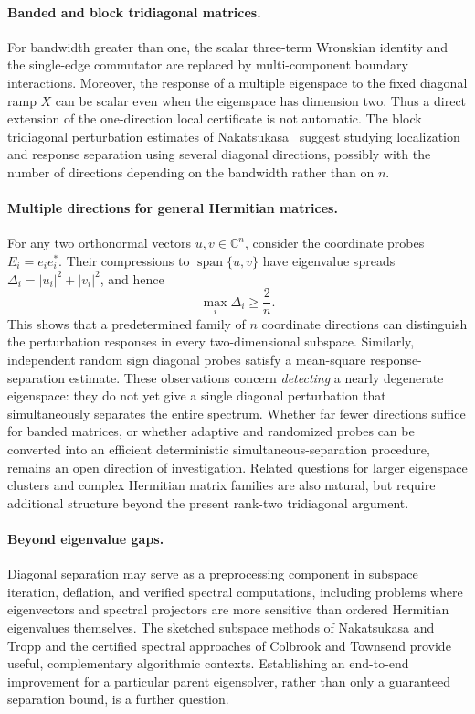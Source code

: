 \documentclass[10pt,a4paper]{article}
\begin{document}
\paragraph{Banded and block tridiagonal matrices.}
For bandwidth greater than one, the scalar three-term Wronskian
identity and the single-edge commutator are replaced by multi-component
boundary interactions. Moreover, the response of a multiple eigenspace
to the fixed diagonal ramp $X$ can be scalar even when the eigenspace
has dimension two. Thus a direct extension of the one-direction
local certificate is not automatic. The block tridiagonal perturbation
estimates of Nakatsukasa~\cite{Nakatsukasa2012} suggest studying
localization and response separation using several diagonal
directions, possibly with the number of directions depending on the
bandwidth rather than on $n$.

\paragraph{Multiple directions for general Hermitian matrices.}
For any two orthonormal vectors $u,v\in\mathbb C^n$, consider the
coordinate probes $E_i=e_ie_i^*$. Their compressions to
$\operatorname{span}\{u,v\}$ have eigenvalue spreads
$\Delta_i=|u_i|^2+|v_i|^2$, and hence
\[
\max_i\Delta_i\geq\frac2n.
\]
This shows that a predetermined family of $n$ coordinate directions
can distinguish the perturbation responses in every two-dimensional
subspace. Similarly, independent random sign diagonal probes satisfy
a mean-square response-separation estimate. These observations concern
\emph{detecting} a nearly degenerate eigenspace: they do not yet give
a single diagonal perturbation that simultaneously separates the
entire spectrum. Whether far fewer directions suffice for banded
matrices, or whether adaptive and randomized probes can be converted
into an efficient deterministic simultaneous-separation procedure,
remains an open direction of investigation. Related questions for
larger eigenspace clusters and complex Hermitian matrix families are
also natural, but require additional structure beyond the present
rank-two tridiagonal argument.

\paragraph{Beyond eigenvalue gaps.}
Diagonal separation may serve as a preprocessing component in
subspace iteration, deflation, and verified spectral computations,
including problems where eigenvectors and spectral projectors are
more sensitive than ordered Hermitian eigenvalues themselves.
The sketched subspace methods of Nakatsukasa and Tropp
\cite{NakatsukasaTropp2024} and the certified spectral approaches
of Colbrook and Townsend \cite{ColbrookTownsend2024,
ColbrookTownsend2025} provide useful, complementary algorithmic
contexts. Establishing an end-to-end improvement for a particular
parent eigensolver, rather than only a guaranteed separation bound,
is a further question.
\end{document}
